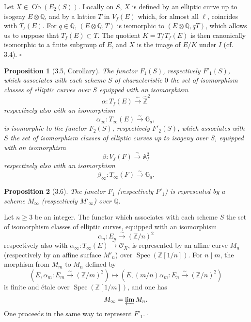 \documentclass[10pt]{article}
\newcommand{\Af}{\mathbb A_f}
\newcommand{\Q}{\mathbb Q}
\newcommand{\Z}{\mathbb Z}
\newcommand{\bZ}{\widehat{\mathbb Z}}
\newcommand{\Ga}{\mathbb G_a}
\newcommand{\Spec}{\operatorname{Spec}}
\newcommand{\cO}{\mathcal O}
\newcommand{\QED}{\hfill$\square$}
\newtheorem*{proposition}{Proposition}
\begin{document}
Let $X\in\operatorname{Ob}(E_2(S))$. Locally on $S$, $X$ is defined by an elliptic curve
up to isogeny $E\otimes\Q$, and by a lattice $T$ in $V_f(E)$ which, for almost all $\ell$,
coincides with $T_\ell(E)$. For $q\in\Q$, $(E\otimes\Q,T)$ is isomorphic to
$(E\otimes\Q,qT)$, which allows us to suppose that $T_f(E)\subset T$. The quotient
$K=T/T_f(E)$ is then canonically isomorphic to a finite subgroup of $E$, and $X$ is the
image of $E/K$ under $I$ (cf. 3.4). \QED

\begin{proposition}[3.5, Corollary]
The functor $F_1(S)$, respectively $F'_1(S)$, which associates with each scheme $S$ of
characteristic $0$ the set of isomorphism classes of elliptic curves over $S$ equipped with
an isomorphism
\[
\alpha:T_f(E)\xrightarrow{\sim}\bZ^2
\]
respectively also with an isomorphism
\[
\alpha_\infty:T_\infty(E)\xrightarrow{\sim}\Ga,
\]
is isomorphic to the functor $F_2(S)$, respectively $F'_2(S)$, which associates with $S$ the
set of isomorphism classes of elliptic curves up to isogeny over $S$, equipped with an
isomorphism
\[
\beta:V_f(F)\xrightarrow{\sim}\Af^2
\]
respectively also with an isomorphism
\[
\beta_\infty:T_\infty(F)\xrightarrow{\sim}\Ga.
\]
\end{proposition}

\begin{proposition}[3.6]
The functor $F_1$ (respectively $F'_1$) is represented by a scheme $M_\infty$ (respectively
$M'_\infty$) over $\Q$.
\end{proposition}

Let $n\ge 3$ be an integer. The functor which associates with each scheme $S$ the set of
isomorphism classes of elliptic curves, equipped with an isomorphism
\[
\alpha_n:E_n\xrightarrow{\sim}(\Z/n)^2
\]
respectively also with $\alpha_\infty:T_\infty(E)\xrightarrow{\sim}\cO_X$, is represented by
an affine curve $M_n$ (respectively by an affine surface $M'_n$) over $\Spec(\Z[1/n])$.
For $n\mid m$, the morphism from $M_m$ to $M_n$ defined by
\[
(E,\alpha_m:E_m\xrightarrow{\sim}(\Z/m)^2)
\longmapsto
(E,(m/n)\alpha_m:E_n\xrightarrow{\sim}(\Z/n)^2)
\]
is finite and étale over $\Spec(\Z[1/m])$, and one has
\[
M_\infty=\varprojlim M_n .
\]
One proceeds in the same way to represent $F'_1$. \QED
\end{document}
